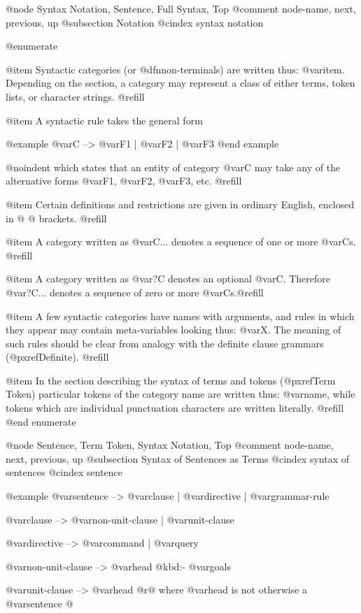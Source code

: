 {{@node Syntax Notation, Sentence, Full Syntax, Top
@comment  node-name,  next,  previous,  up
@subsection Notation
@cindex syntax notation

@enumerate

@item
Syntactic categories (or @dfn{non-terminals}) are written thus:
@var{item}.  Depending on the section, a category may represent a class
of either terms, token lists, or character strings. @refill

@item
A syntactic rule takes the general form 

@example
@var{C} --> @var{F1} | @var{F2} | @var{F3}
@end example

@noindent
which states that an entity of category @var{C} may take any of the alternative
forms @var{F1}, @var{F2}, @var{F3}, etc. @refill

@item
Certain definitions and restrictions are given in ordinary English,
enclosed in @{ @} brackets. @refill

@item
A category written as @var{C...} denotes a sequence of one or more
@var{C}s. @refill

@item
A category written as @var{?C} denotes an optional @var{C}.
Therefore @var{?C...} denotes a sequence of zero or more
@var{C}s.@refill

@item
A few syntactic categories have names with arguments, and rules in which
they appear may contain meta-variables looking thus: @var{X}.  The meaning
of such rules should be clear from analogy with the definite clause
grammars (@pxref{Definite}). @refill

@item
In the section describing the syntax of terms and tokens (@pxref{Term
Token}) particular tokens of the category name are written thus:
@var{name}, while tokens which are individual punctuation characters are
written literally. @refill
@end enumerate

@node Sentence, Term Token, Syntax Notation, Top
@comment  node-name,  next,  previous,  up
@subsection Syntax of Sentences as Terms
@cindex syntax of sentences
@cindex sentence

@example
@var{sentence}          --> @var{clause} | @var{directive} | @var{grammar-rule}

@var{clause}            --> @var{non-unit-clause} | @var{unit-clause}

@var{directive}         --> @var{command} | @var{query}

@var{non-unit-clause}   --> @var{head} @kbd{:-} @var{goals}

@var{unit-clause}       --> @var{head}
                         @r{@{ where @var{head} is not otherwise a @var{sentence} @}}

}}
